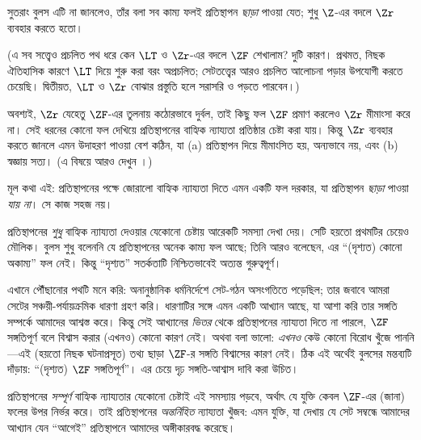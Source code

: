 \documentclass[../../../include/open-logic-section]{subfiles}
\begin{document}
সুতরাং বুলস এটি না জানলেও, তাঁর বলা
সব কাম্য ফলই প্রতিস্থাপন \emph{ছাড়া}
পাওয়া যেত; শুধু $\Z$-এর বদলে
$\Zr$ ব্যবহার করতে হতো।

(এ সব সত্ত্বেও প্রচলিত পথ ধরে কেন
$\LT$ ও $\Zr$-এর বদলে $\ZF$
শেখালাম? দুটি কারণ। প্রথমত, নিছক
ঐতিহাসিক কারণে $\LT$ দিয়ে শুরু করা
বরং অপ্রচলিত; সেটতত্ত্বের আরও প্রচলিত
আলোচনা পড়ার উপযোগী করতে চেয়েছি।
দ্বিতীয়ত, $\LT$ ও $\Zr$ বোঝার
প্রস্তুতি হলে সরাসরি \citealt{Potter2004}
ও \citealt{ButtonLT1} পড়তে পারবেন।)

অবশ্যই, $\Zr$ যেহেতু $\ZF$-এর তুলনায়
কঠোরভাবে দুর্বল, তাই কিছু ফল $\ZF$
প্রমাণ করলেও $\Zr$ মীমাংসা করে না।
সেই ধরনের কোনো ফল দেখিয়ে প্রতিস্থাপনের
বাহ্যিক ন্যায্যতা প্রতিষ্ঠার চেষ্টা করা যায়।
কিন্তু $\Zr$ ব্যবহার করতে জানলে এমন
উদাহরণ পাওয়া বেশ কঠিন, যা
(a) প্রতিস্থাপন দিয়ে মীমাংসিত হয়,
অন্যভাবে নয়, এবং (b) স্বজ্ঞায় সত্য।
(এ বিষয়ে আরও দেখুন
\citealt[\S13.2]{Potter2004}।)

মূল কথা এই: প্রতিস্থাপনের পক্ষে জোরালো
বাহ্যিক ন্যায্যতা দিতে এমন একটি ফল
দরকার, যা প্রতিস্থাপন \emph{ছাড়া}
পাওয়া \emph{যায় না}। সে কাজ সহজ নয়।

প্রতিস্থাপনের \emph{শুধু} বাহ্যিক ন্যায্যতা
দেওয়ার যেকোনো চেষ্টায় আরেকটি সমস্যা
দেখা দেয়। সেটি হয়তো প্রথমটির চেয়েও
মৌলিক। বুলস শুধু বলেননি যে প্রতিস্থাপনের
অনেক কাম্য ফল আছে; তিনি আরও বলেছেন,
এর ``(দৃশ্যত) কোনো অকাম্য'' ফল নেই।
কিন্তু ``দৃশ্যত'' সতর্কতাটি নিশ্চিতভাবেই
অত্যন্ত গুরুত্বপূর্ণ।

এখানে পৌঁছানোর পথটি মনে করি: অনানুষ্ঠানিক ধর্মনির্দেশে
সেট-গঠন অসংগতিতে পড়েছিল; তার জবাবে
আমরা সেটের সঞ্চয়ী-পর্যায়ক্রমিক ধারণা
গ্রহণ করি। ধারণাটির সঙ্গে এমন একটি
আখ্যান আছে, যা আশা করি তার সঙ্গতি
সম্পর্কে আমাদের আশ্বস্ত করে। কিন্তু সেই
আখ্যানের \emph{ভিতর} থেকে প্রতিস্থাপনের
ন্যায্যতা দিতে না পারলে, $\ZF$ সঙ্গতিপূর্ণ
বলে বিশ্বাস করার (এখনও) কোনো কারণ নেই।
অথবা বলা ভালো: \emph{এখনও} কেউ কোনো
বিরোধ খুঁজে পাননি—এই (হয়তো নিছক
ঘটনাপ্রসূত) তথ্য ছাড়া $\ZF$-র সঙ্গতি
বিশ্বাসের কারণ নেই। ঠিক এই অর্থেই
বুলসের মন্তব্যটি দাঁড়ায়: ``(দৃশ্যত)
$\ZF$ সঙ্গতিপূর্ণ''। এর চেয়ে দৃঢ়
সঙ্গতি-আশ্বাস দাবি করা উচিত।

প্রতিস্থাপনের \emph{সম্পূর্ণ} বাহ্যিক
ন্যায্যতার যেকোনো চেষ্টাই এই সমস্যায়
পড়বে, অর্থাৎ যে যুক্তি কেবল $\ZF$-এর
(জানা) ফলের উপর নির্ভর করে। তাই
প্রতিস্থাপনের \emph{অন্তর্নিহিত} ন্যায্যতা
খুঁজব: এমন যুক্তি, যা দেখায় যে সেট
সম্বন্ধে আমাদের আখ্যান যেন ``আগেই''
প্রতিস্থাপনে আমাদের অঙ্গীকারবদ্ধ করেছে।
\end{document}

